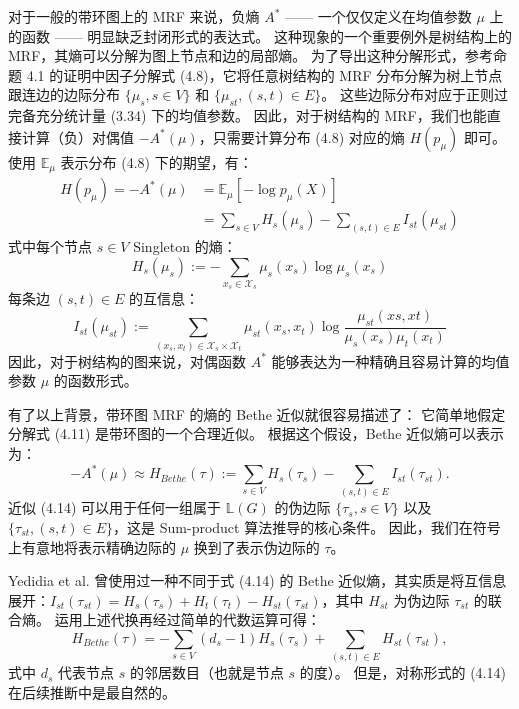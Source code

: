 对于一般的带环图上的 MRF 来说，负熵 $A^*$ —— 一个仅仅定义在均值参数 $\mu$ 上的函数 —— 明显缺乏封闭形式的表达式。
这种现象的一个重要例外是树结构上的 MRF，其熵可以分解为图上节点和边的局部熵。
为了导出这种分解形式，参考命题 4.1 的证明中因子分解式 (4.8)，它将任意树结构的 MRF 分布分解为树上节点跟连边的边际分布 $\{\mu_s, s \in V\}$ 和 $\{\mu_{st}, (s, t) \in E\}$。
这些边际分布对应于正则过完备充分统计量 (3.34) 下的均值参数。
因此，对于树结构的 MRF，我们也能直接计算（负）对偶值 $-A^*(\mu)$，只需要计算分布 (4.8) 对应的熵 $H(p_{\mu})$ 即可。
使用 $\mathbb{E}_{\mu}$ 表示分布 (4.8) 下的期望，有：
\begin{align}
    H(p_{\mu}) = -A^*(\mu) &= \mathbb{E}_{\mu}[-\log p_{\mu}(X)] \nonumber \\
    &= \sum_{s \in V}H_s(\mu_s) - \sum_{(s, t) \in E}I_{st}(\mu_{st})
\end{align}
式中每个节点 $s \in V$ Singleton 的熵：
\begin{equation}
    H_s(\mu_s) := -\sum_{x_s \in \mathcal{X}_s}\mu_s(x_s)\log\mu_s(x_s)
\end{equation}
每条边 $(s, t) \in E$ 的互信息：
\begin{equation}
    I_{st}(\mu_{st}) := \sum_{(x_s, x_t) \in \mathcal{X}_s \times \mathcal{X}_t} \mu_{st}(x_s, x_t)\log\frac{\mu_{st}(xs, xt)}{\mu_s(x_s)\mu_t(x_t)}
\end{equation}
因此，对于树结构的图来说，对偶函数 $A^*$ 能够表达为一种精确且容易计算的均值参数 $\mu$ 的函数形式。

有了以上背景，带环图 MRF 的熵的 Bethe 近似就很容易描述了：
它简单地假定分解式 (4.11) 是带环图的一个合理近似。
根据这个假设，Bethe 近似熵可以表示为：
\begin{equation}
    -A^*(\mu) \approx H_{Bethe}(\tau) := \sum_{s \in V}H_s(\tau_s) - \sum_{(s, t) \in E}I_{st}(\tau_{st}).
\end{equation}
近似 (4.14) 可以用于任何一组属于 $\mathbb{L}(G)$ 的伪边际 $\{\tau_s, s \in V\}$ 以及 $\{\tau_{st}, (s, t) \in E\}$，这是 Sum-product 算法推导的核心条件。
因此，我们在符号上有意地将表示精确边际的 $\mu$ 换到了表示伪边际的 $\tau$。

Yedidia et al. 曾使用过一种不同于式 (4.14) 的 Bethe 近似熵，其实质是将互信息展开：$I_{st}(\tau_{st}) = H_s(\tau_s) + H_t(\tau_t) - H_{st}(\tau_{st})$，其中 $H_{st}$ 为伪边际 $\tau_{st}$ 的联合熵。
运用上述代换再经过简单的代数运算可得：
\begin{equation}
    H_{Bethe}(\tau) = -\sum_{s \in V}(d_s-1)H_s(\tau_s) + \sum_{(s, t) \in E}H_{st}(\tau_{st}), 
\end{equation}
式中 $d_s$ 代表节点 $s$ 的邻居数目（也就是节点 $s$ 的度）。
但是，对称形式的 (4.14) 在后续推断中是最自然的。


